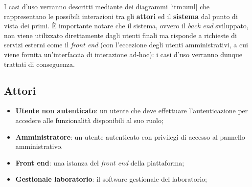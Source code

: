 I casi d'uso verranno descritti mediante dei diagrammi \ref{itm:uml} che rappresentano le possibili interazioni tra gli \textbf{attori} ed il \textbf{sistema} dal punto di vista dei primi. È importante notare che il sistema, ovvero il \textit{back end} sviluppato, non viene utilizzato direttamente dagli utenti finali ma risponde a richieste di servizi esterni come il \textit{front end} (con l'eccezione degli utenti amministrativi, a cui viene fornita un'interfaccia di interazione ad-hoc): i casi d'uso verranno dunque trattati di conseguenza.

\subsection{Attori}
\begin{itemize}
    \item \textbf{Utente non autenticato}: un utente che deve effettuare l'autenticazione per accedere alle funzionalità disponibili al suo ruolo;
    \item \textbf{Amministratore}: un utente autenticato con privilegi di accesso al pannello amministrativo.
    \item \textbf{Front end}: una istanza del \textit{front end} della piattaforma;
    \item \textbf{Gestionale laboratorio}: il software gestionale del laboratorio;
\end{itemize}
